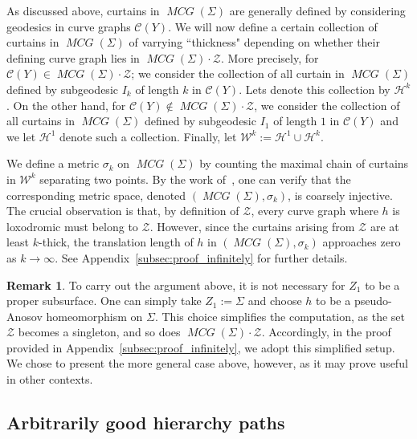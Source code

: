 \documentclass{amsart}
\numberwithin{thm}{section}
\numberwithin{figure}{section}
\theoremstyle{definition}
\newtheorem{remark}[thm]{Remark}
\theoremstyle{definition}
\theoremstyle{remark}
\numberwithin{equation}{section}
\DeclareMathOperator{\MCG}{\mathit{MCG}}
\theoremstyle{plain}
\begin{document}
As discussed above, curtains in $\MCG(\Sigma)$ are generally defined by considering geodesics in curve graphs $\mathcal{C}(Y)$. We will now define a certain collection of curtains in $\MCG(\Sigma)$ of varrying ``thickness" depending on whether their defining curve graph lies in $\MCG(\Sigma) \cdot \mathcal{Z}$. More precisely, for $\mathcal{C}(Y) \in \MCG(\Sigma) \cdot \mathcal{Z}$; we consider the collection of all curtain in $\MCG(\Sigma)$ defined by subgeodesic $I_k$ of length $k$ in $\mathcal{C}(Y).$ Lets denote this collection by $\mathcal{H}^k$. On the other hand, for $\mathcal{C}(Y) \notin \MCG(\Sigma) \cdot \mathcal{Z}$, we consider the collection of all curtains in $\MCG(\Sigma)$ defined by subgeodesic $I_1$ of length $1$ in $\mathcal{C}(Y)$ and we let $\mathcal{H}^1$ denote such a collection. Finally, let $\mathcal{W}^k:= \mathcal{H}^1 \cup \mathcal{H}^k$. 


We define a metric $\sigma_k$ on $\MCG(\Sigma)$ by counting the maximal chain of curtains in $\mathcal{W}^k$ separating two points. By the work of~\cite{PetytZalloum24}, one can verify that the corresponding metric space, denoted $(\MCG(\Sigma), \sigma_k)$, is coarsely injective. The crucial observation is that, by definition of $\mathcal{Z}$, every curve graph where $h$ is loxodromic must belong to $\mathcal{Z}$. However, since the curtains arising from $\mathcal{Z}$ are at least $k$-thick, the translation length of $h$ in $(\MCG(\Sigma), \sigma_k)$ approaches zero as $k \to \infty$. See Appendix~\ref{subsec:proof_infinitely} for further details.


\begin{remark}
To carry out the argument above, it is not necessary for $Z_1$ to be a proper subsurface. One can simply take $Z_1 := \Sigma$ and choose $h$ to be a pseudo-Anosov homeomorphism on $\Sigma$. This choice simplifies the computation, as the set $\mathcal{Z}$ becomes a singleton, and so does $\MCG(\Sigma) \cdot \mathcal{Z}$. Accordingly, in the proof provided in Appendix~\ref{subsec:proof_infinitely}, we adopt this simplified setup. We chose to present the more general case above, however, as it may prove useful in other contexts.
\end{remark}





\subsection{Arbitrarily good hierarchy paths} 
\end{document}
